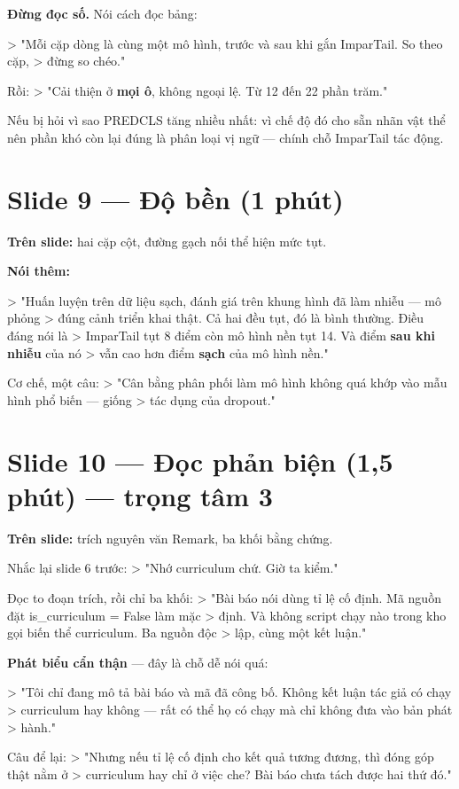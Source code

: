\documentclass[11pt,a4paper]{article}
\newcommand{\code}[1]{{\ttfamily\small\color{codetext}#1}}
\begin{document}
\textbf{Đừng đọc số.} Nói cách đọc bảng:

> "Mỗi cặp dòng là cùng một mô hình, trước và sau khi gắn ImparTail. So theo cặp, > đừng so chéo."

Rồi: > "Cải thiện ở \textbf{mọi ô}, không ngoại lệ. Từ 12 đến 22 phần trăm."

Nếu bị hỏi vì sao PREDCLS tăng nhiều nhất: vì chế độ đó cho sẵn nhãn vật thể nên phần khó còn lại đúng là phân loại vị ngữ --- chính chỗ ImparTail tác động.

\section{Slide 9 --- Độ bền (1 phút)}
\textbf{Trên slide:} hai cặp cột, đường gạch nối thể hiện mức tụt.

\textbf{Nói thêm:}

> "Huấn luyện trên dữ liệu sạch, đánh giá trên khung hình đã làm nhiễu --- mô phỏng > đúng cảnh triển khai thật. Cả hai đều tụt, đó là bình thường. Điều đáng nói là > ImparTail tụt 8 điểm còn mô hình nền tụt 14. Và điểm \textbf{sau khi nhiễu} của nó > vẫn cao hơn điểm \textbf{sạch} của mô hình nền."

Cơ chế, một câu: > "Cân bằng phân phối làm mô hình không quá khớp vào mẫu hình phổ biến --- giống > tác dụng của dropout."

\section{Slide 10 --- Đọc phản biện (1,5 phút) --- trọng tâm 3}
\textbf{Trên slide:} trích nguyên văn Remark, ba khối bằng chứng.

Nhắc lại slide 6 trước: > "Nhớ curriculum chứ. Giờ ta kiểm."

Đọc to đoạn trích, rồi chỉ ba khối: > "Bài báo nói dùng tỉ lệ cố định. Mã nguồn đặt \code{is\_curriculum = False} làm mặc > định. Và không script chạy nào trong kho gọi biến thể curriculum. Ba nguồn độc > lập, cùng một kết luận."

\textbf{Phát biểu cẩn thận} --- đây là chỗ dễ nói quá:

> "Tôi chỉ đang mô tả bài báo và mã đã công bố. Không kết luận tác giả có chạy > curriculum hay không --- rất có thể họ có chạy mà chỉ không đưa vào bản phát > hành."

Câu để lại: > "Nhưng nếu tỉ lệ cố định cho kết quả tương đương, thì đóng góp thật nằm ở > curriculum hay chỉ ở việc che? Bài báo chưa tách được hai thứ đó."
\end{document}
